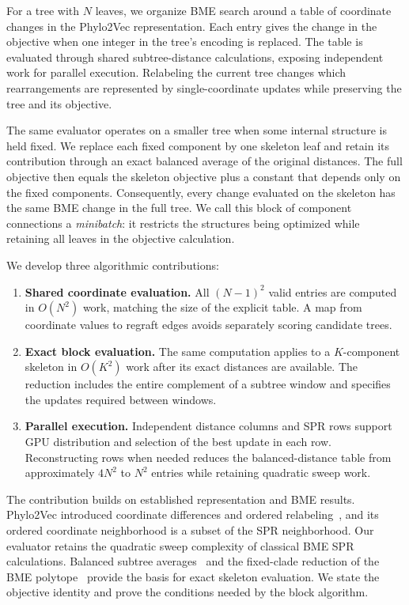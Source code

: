 \documentclass[11pt,a4paper]{article}
\makeatletter
\DeclareRobustCommand{\_}{\ifmmode\nfss@text{\textunderscore}\else\textunderscore\allowbreak\fi}
\theoremstyle{definition}
\makeatother
\begin{document}
For a tree with $N$ leaves, we organize BME search around a table of coordinate changes in the Phylo2Vec representation.
Each entry gives the change in the objective when one integer in the tree's encoding is replaced.
The table is evaluated through shared subtree-distance calculations, exposing independent work for parallel execution.
Relabeling the current tree changes which rearrangements are represented by single-coordinate updates while preserving the tree and its objective.

The same evaluator operates on a smaller tree when some internal structure is held fixed.
We replace each fixed component by one skeleton leaf and retain its contribution through an exact balanced average of the original distances.
The full objective then equals the skeleton objective plus a constant that depends only on the fixed components.
Consequently, every change evaluated on the skeleton has the same BME change in the full tree.
We call this block of component connections a \emph{minibatch}: it restricts the structures being optimized while retaining all leaves in the objective calculation.

\begin{samepage}
We develop three algorithmic contributions:
\begin{enumerate}
 \item \textbf{Shared coordinate evaluation.} All $(N-1)^2$ valid entries are computed in $O(N^2)$ work, matching the size of the explicit table. A map from coordinate values to regraft edges avoids separately scoring candidate trees.
 \item \textbf{Exact block evaluation.} The same computation applies to a $K$-component skeleton in $O(K^2)$ work after its exact distances are available. The reduction includes the entire complement of a subtree window and specifies the updates required between windows.
 \item \textbf{Parallel execution.} Independent distance columns and SPR rows support GPU distribution and selection of the best update in each row. Reconstructing rows when needed reduces the balanced-distance table from approximately $4N^2$ to $N^2$ entries while retaining quadratic sweep work.
\end{enumerate}
\end{samepage}

The contribution builds on established representation and BME results.
Phylo2Vec introduced coordinate differences and ordered relabeling~\cite[Section~1.3.2]{penn2024phylo2vec}, and its ordered coordinate neighborhood is a subset of the SPR neighborhood.
Our evaluator retains the quadratic sweep complexity of classical BME SPR calculations.
Balanced subtree averages~\cite{desper2002fast,desper2004theory} and the fixed-clade reduction of the BME polytope~\cite[Section~2.4]{haws2011optimality} provide the basis for exact skeleton evaluation.
We state the objective identity and prove the conditions needed by the block algorithm.
\end{document}
